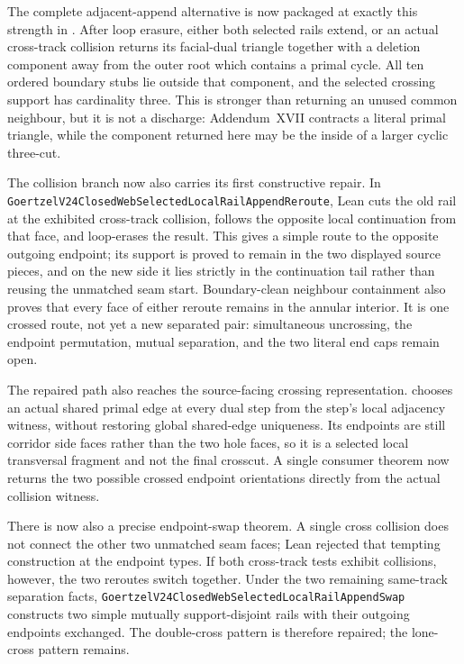\documentclass[11pt]{article}
\theoremstyle{definition}
\begin{document}
The complete adjacent-append alternative is now packaged at exactly this
strength in
.
After loop erasure, either both selected rails extend, or an actual
cross-track collision returns its facial-dual triangle together with a
deletion component away from the outer root which contains a primal cycle.
All ten ordered boundary stubs lie outside that component, and the selected
crossing support has cardinality three.  This is stronger than returning an
unused common neighbour, but it is not a discharge: Addendum~XVII contracts a
literal primal triangle, while the component returned here may be the inside
of a larger cyclic three-cut.

The collision branch now also carries its first constructive repair.  In
\texttt{GoertzelV24ClosedWebSelectedLocalRailAppendReroute}, Lean cuts the old
rail at the exhibited cross-track collision, follows the opposite local
continuation from that face, and loop-erases the result.  This gives a simple
route to the opposite outgoing endpoint; its support is proved to remain in
the two displayed source pieces, and on the new side it lies strictly in the
continuation tail rather than reusing the unmatched seam start.
Boundary-clean neighbour containment also
proves that every face of either reroute remains in the annular interior.  It
is one crossed route, not yet a new
separated pair: simultaneous uncrossing, the endpoint permutation, mutual
separation, and the two literal end caps remain open.

The repaired path also reaches the source-facing crossing representation.
chooses an actual shared primal edge at every dual step from the step's local
adjacency witness, without restoring global shared-edge uniqueness.  Its
endpoints are still corridor side faces rather than the two hole faces, so it
is a selected local transversal fragment and not the final crosscut.  A single
consumer theorem now returns the two possible crossed endpoint orientations
directly from the actual collision witness.

There is now also a precise endpoint-swap theorem.  A single cross collision
does not connect the other two unmatched seam faces; Lean rejected that
tempting construction at the endpoint types.  If both cross-track tests
exhibit collisions, however, the two reroutes switch together.  Under the two
remaining same-track separation facts,
\texttt{GoertzelV24ClosedWebSelectedLocalRailAppendSwap} constructs two simple
mutually support-disjoint rails with their outgoing endpoints exchanged.  The
double-cross pattern is therefore repaired; the lone-cross pattern remains.
\end{document}
